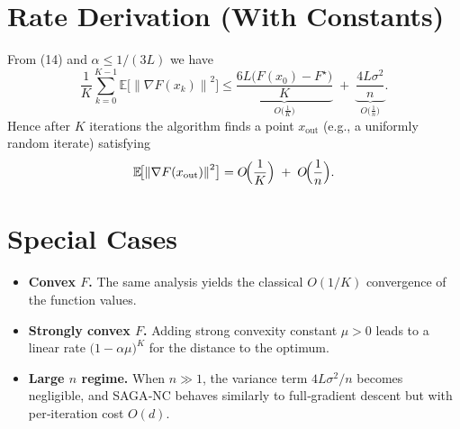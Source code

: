 \documentclass{article}
\newcommand{\E}{\mathbb{E}}
\newcommand{\norm}[1]{\left\lVert#1\right\rVert}
\begin{document}
\section*{Rate Derivation (With Constants)}
From (14) and $\alpha\le 1/(3L)$ we have
\[
\frac{1}{K}\sum_{k=0}^{K-1}\E\!\bigl[\norm{\nabla F(x_k)}^{2}\bigr]
\le
\underbrace{\frac{6L\bigl(F(x_0)-F^{\star}\bigr)}{K}}_{\displaystyle O\!\bigl(\frac{1}{K}\bigr)}
\;+\;
\underbrace{\frac{4L\sigma^{2}}{n}}_{\displaystyle O\!\bigl(\frac{1}{n}\bigr)}.
\]
Hence after $K$ iterations the algorithm finds a point $x_{\text{out}}$ (e.g., a uniformly random iterate) satisfying
\[
\E\!\bigl[\norm{\nabla F(x_{\text{out}})}^{2}\bigr]
= O\!\Bigl(\frac{1}{K}\Bigr) \;+\; O\!\Bigl(\frac{1}{n}\Bigr).
\]

\section*{Special Cases}
\begin{itemize}[leftmargin=*]
    \item \textbf{Convex $F$.} The same analysis yields the classical $O(1/K)$ convergence of the function values.
    \item \textbf{Strongly convex $F$.} Adding strong convexity constant $\mu>0$ leads to a linear rate 
    $\bigl(1-\alpha\mu\bigr)^{K}$ for the distance to the optimum.
    \item \textbf{Large $n$ regime.} When $n\gg 1$, the variance term $4L\sigma^{2}/n$ becomes negligible, and SAGA‑NC behaves similarly to full‑gradient descent but with per‑iteration cost $O(d)$.
\end{itemize}
\end{document}

